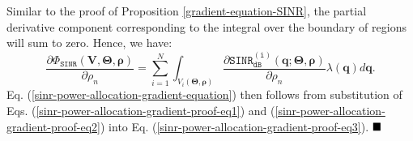 Similar to the proof of Proposition \ref{gradient-equation-SINR}, the partial derivative component corresponding to the integral over the boundary of regions will sum to zero. Hence, we have:
\begin{equation}\label{sinr-power-allocation-gradient-proof-eq3}
    \frac{\partial \Phi_{\mathtt{SINR}}(\bm{V},\mathbf{\Theta}, \bm{\rho})}{\partial \rho_n} = 
    \sum_{i=1}^{N} \int_{V_i(\mathbf{\Theta}, \bm{\rho})} \!\!\!\!\frac{\partial \mathtt{SINR_{dB}^{(i)}} (\bm{q}; \mathbf{\Theta}, \bm{\rho})}{\partial \rho_n}  \lambda(\bm{q})d\bm{q}.
\end{equation}
Eq. (\ref{sinr-power-allocation-gradient-equation}) then follows from substitution of Eqs. (\ref{sinr-power-allocation-gradient-proof-eq1}) and (\ref{sinr-power-allocation-gradient-proof-eq2}) into Eq. (\ref{sinr-power-allocation-gradient-proof-eq3}). $\hfill\blacksquare$


